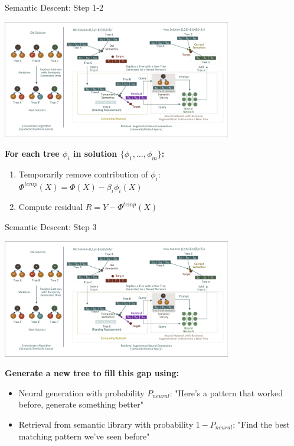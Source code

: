 \documentclass[aspectratio=1610]{beamer}
\begin{document}
    \begin{frame}{Semantic Descent: Step 1-2}
        \begin{center}
            \includegraphics[width=0.75\textwidth, trim=8pt 8pt 8pt 8pt, clip]{figs/Motivation.pdf}
        \end{center}

        \textbf{For each tree $\phi_i$ in solution $\{\phi_1, \ldots, \phi_m\}$:}
        \begin{enumerate}
            \item Temporarily remove contribution of $\phi_i$:\\
            $\Phi^{temp}(X) = \Phi(X) - \beta_i \phi_i(X)$
            \item Compute residual $R = Y - \Phi^{temp}(X)$
        \end{enumerate}
    \end{frame}
    \begin{frame}{Semantic Descent: Step 3}
        \begin{center}
            \includegraphics[width=0.75\textwidth, trim=8pt 8pt 8pt 8pt, clip]{figs/Motivation.pdf}
        \end{center}

        \textbf{Generate a new tree to fill this gap using:}
        \begin{itemize}
            \item Neural generation with probability $P_{neural}$: "Here's a pattern that worked before, generate something better"
            \item Retrieval from semantic library with probability $1-P_{neural}$: "Find the best matching pattern we've seen before"
        \end{itemize}
    \end{frame}
\end{document}
